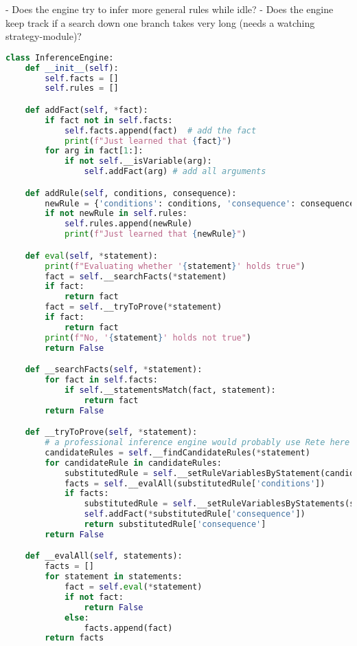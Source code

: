 			- Does the engine try to infer more general rules while idle? 
			- Does the engine keep track if a search down one branch takes very long (needs a watching strategy-module)?
		


\begin{lstlisting}[language=python]
class InferenceEngine:
    def __init__(self):
        self.facts = []
        self.rules = []

    def addFact(self, *fact):
        if fact not in self.facts:
            self.facts.append(fact)  # add the fact
            print(f"Just learned that {fact}")
        for arg in fact[1:]:
            if not self.__isVariable(arg):
                self.addFact(arg) # add all arguments

    def addRule(self, conditions, consequence):
        newRule = {'conditions': conditions, 'consequence': consequence}
        if not newRule in self.rules:
            self.rules.append(newRule)
            print(f"Just learned that {newRule}")

    def eval(self, *statement):
        print(f"Evaluating whether '{statement}' holds true")
        fact = self.__searchFacts(*statement)
        if fact:
            return fact
        fact = self.__tryToProve(*statement)
        if fact:
            return fact
        print(f"No, '{statement}' holds not true")
        return False

    def __searchFacts(self, *statement):
        for fact in self.facts:
            if self.__statementsMatch(fact, statement):
                return fact
        return False

    def __tryToProve(self, *statement):
        # a professional inference engine would probably use Rete here
        candidateRules = self.__findCandidateRules(*statement)
        for candidateRule in candidateRules:
            substitutedRule = self.__setRuleVariablesByStatement(candidateRule, statement)
            facts = self.__evalAll(substitutedRule['conditions'])
            if facts:
                substitutedRule = self.__setRuleVariablesByStatements(substitutedRule, facts)
                self.addFact(*substitutedRule['consequence'])
                return substitutedRule['consequence']
        return False

    def __evalAll(self, statements):
        facts = []
        for statement in statements:
            fact = self.eval(*statement)
            if not fact:
                return False
            else:
                facts.append(fact)
        return facts


\end{lstlisting}
